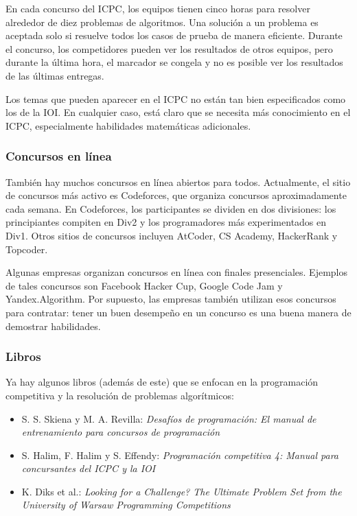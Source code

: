 En cada concurso del ICPC, los equipos tienen cinco horas para
resolver alrededor de diez problemas de algoritmos.
Una solución a un problema es aceptada solo si resuelve
todos los casos de prueba de manera eficiente.
Durante el concurso, los competidores pueden ver los resultados de otros equipos,
pero durante la última hora, el marcador se congela y no
es posible ver los resultados de las últimas entregas.

Los temas que pueden aparecer en el ICPC no están tan bien
especificados como los de la IOI.
En cualquier caso, está claro que se necesita más conocimiento
en el ICPC, especialmente habilidades matemáticas adicionales.

\subsubsection{Concursos en línea}

También hay muchos concursos en línea abiertos para todos.
Actualmente, el sitio de concursos más activo es Codeforces,
que organiza concursos aproximadamente cada semana.
En Codeforces, los participantes se dividen en dos divisiones:
los principiantes compiten en Div2 y los programadores más experimentados en Div1.
Otros sitios de concursos incluyen AtCoder, CS Academy, HackerRank y Topcoder.

Algunas empresas organizan concursos en línea con finales presenciales.
Ejemplos de tales concursos son Facebook Hacker Cup,
Google Code Jam y Yandex.Algorithm.
Por supuesto, las empresas también utilizan esos concursos para contratar:
tener un buen desempeño en un concurso es una buena manera de demostrar habilidades.

\subsubsection{Libros}

Ya hay algunos libros (además de este) que
se enfocan en la programación competitiva y la
resolución de problemas algorítmicos:

\begin{itemize}
\item S. S. Skiena y M. A. Revilla:
\emph{Desafíos de programación: El manual de entrenamiento para concursos de programación} \cite{ski20}
\item S. Halim, F. Halim y S. Effendy:
\emph{Programación competitiva 4: Manual para concursantes del ICPC y la IOI} \cite{hal21}
\item K. Diks et al.:
\emph{Looking for a Challenge? The Ultimate Problem Set from
the University of Warsaw Programming Competitions} \cite{dik12}
\end{itemize}

